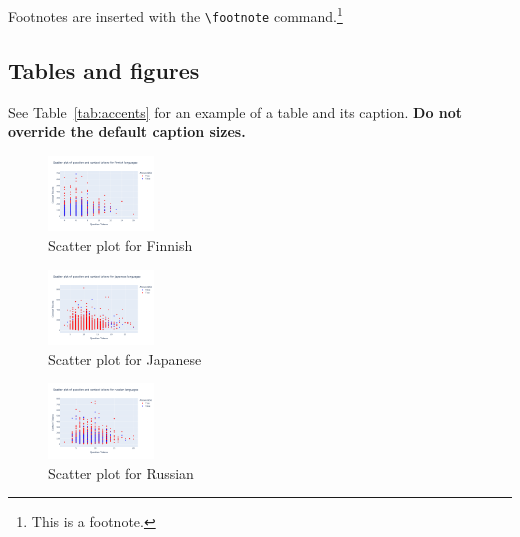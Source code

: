 \documentclass[11pt]{article}
\begin{document}
Footnotes are inserted with the \verb|\footnote| command.\footnote{This is a footnote.}

\subsection{Tables and figures}

See Table~\ref{tab:accents} for an example of a table and its caption.
\textbf{Do not override the default caption sizes.}

\begin{figure}[ht]
    \centering
    \includegraphics[width=0.25\textwidth]{week1_c_scatter_fi.png}
    \caption{Scatter plot for Finnish}
    \label{fig:scatter_week1_c_fi}
\end{figure}

\begin{figure}[ht]
    \centering
    \includegraphics[width=0.25\textwidth]{week1_c_scatter_ja.png}
    \caption{Scatter plot for Japanese}
    \label{fig:scatter_week1_c_ja}
\end{figure}

\begin{figure}[ht]
    \centering
    \includegraphics[width=0.25\textwidth]{week1_c_scatter_ru.png}
    \caption{Scatter plot for Russian}
    \label{fig:scatter_week1_c_ru}
\end{figure}

\end{document}
